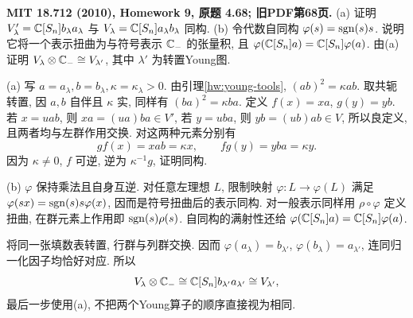 \begin{exercise}\label{hw:4.68}
\textbf{MIT 18.712 (2010), Homework 9, 原题 4.68; 旧PDF第68页.}
(a) 证明 $V'_\lambda=\mathbb C[S_n]b_\lambda a_\lambda$ 与 $V_\lambda=\mathbb C[S_n]a_\lambda b_\lambda$ 同构.
(b) 令代数自同构 $\varphi(s)=\operatorname{sgn}(s)s$. 说明它将一个表示扭曲为与符号表示 $\mathbb C_-$ 的张量积, 且 $\varphi(\mathbb C[S_n]a)=\mathbb C[S_n]\varphi(a)$. 由(a)证明 $V_\lambda\otimes\mathbb C_-\cong V_{\lambda'}$, 其中 $\lambda'$ 为转置Young图.
\end{exercise}
\begin{solution}
(a) 写 $a=a_\lambda,b=b_\lambda,\kappa=\kappa_\lambda>0$. 由引理\ref{hw:young-tools}, $(ab)^2=\kappa ab$. 取共轭转置, 因 $a,b$ 自伴且 $\kappa$ 实, 同样有 $(ba)^2=\kappa ba$. 定义 $f(x)=xa$, $g(y)=yb$. 若 $x=uab$, 则 $xa=(ua)ba\in V'$, 若 $y=uba$, 则 $yb=(ub)ab\in V$, 所以良定义, 且两者均与左群作用交换. 对这两种元素分别有
\[
 gf(x)=xab=\kappa x,\qquad fg(y)=yba=\kappa y.
\]
因为 $\kappa\ne0$, $f$ 可逆, 逆为 $\kappa^{-1}g$, 证明同构.

(b) $\varphi$ 保持乘法且自身互逆. 对任意左理想 $L$, 限制映射 $\varphi:L\to\varphi(L)$ 满足 $\varphi(sx)=\operatorname{sgn}(s)s\varphi(x)$, 因而是符号扭曲后的表示同构. 对一般表示同样用 $\rho\circ\varphi$ 定义扭曲, 在群元素上作用即 $\operatorname{sgn}(s)\rho(s)$. 自同构的满射性还给 $\varphi(\mathbb C[S_n]a)=\mathbb C[S_n]\varphi(a)$.

将同一张填数表转置, 行群与列群交换. 因而 $\varphi(a_\lambda)=b_{\lambda'}$, $\varphi(b_\lambda)=a_{\lambda'}$, 连同归一化因子均恰好对应. 所以
\[
 V_\lambda\otimes\mathbb C_-\cong
 \mathbb C[S_n]b_{\lambda'}a_{\lambda'}\cong V_{\lambda'},
\]
最后一步使用(a), 不把两个Young算子的顺序直接视为相同.
\end{solution}

